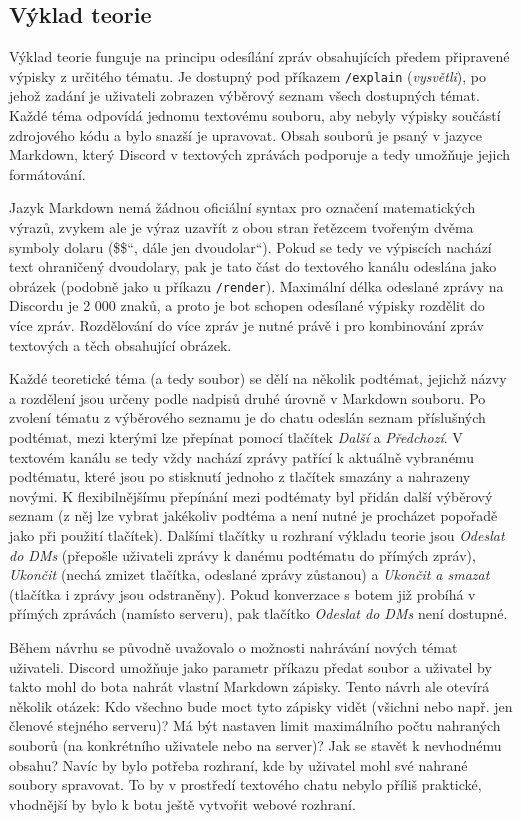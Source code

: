 \documentclass[FM]{tulthesis}
\begin{document}
	\subsection{Výklad teorie}
	
	Výklad teorie funguje na principu odesílání zpráv obsahujících předem připravené výpisky z určitého tématu. Je dostupný pod příkazem \verb*|/explain| (\textit{vysvětli}), po jehož zadání je uživateli zobrazen výběrový seznam všech dostupných témat. Každé téma odpovídá jednomu textovému souboru, aby nebyly výpisky součástí zdrojového kódu a bylo snazší je upravovat. Obsah souborů je psaný v jazyce Markdown, který Discord v textových zprávách podporuje a tedy umožňuje jejich formátování.
	
	Jazyk Markdown nemá žádnou oficiální syntax pro označení matematických výrazů, zvykem ale je výraz uzavřít z obou stran řetězcem tvořeným dvěma symboly dolaru (\quotedblbase\$\$\textquotedblleft, dále jen \quotedblbase dvoudolar\textquotedblleft). Pokud se tedy ve výpiscích nachází text ohraničený dvoudolary, pak je tato část do textového kanálu odeslána jako obrázek (podobně jako u příkazu \verb*|/render|). Maximální délka odeslané zprávy na Discordu je 2 000 znaků, a proto je bot schopen odesílané výpisky rozdělit do více zpráv. Rozdělování do více zpráv je nutné právě i pro kombinování zpráv textových a těch obsahující obrázek.
	
	Každé teoretické téma (a tedy soubor) se dělí na několik podtémat, jejichž názvy a rozdělení jsou určeny podle nadpisů druhé úrovně v Markdown souboru. Po zvolení tématu z výběrového seznamu je do chatu odeslán seznam příslušných podtémat, mezi kterými lze přepínat pomocí tlačítek \textit{Další} a \textit{Předchozí}. V textovém kanálu se tedy vždy nachází zprávy patřící k aktuálně vybranému podtématu, které jsou po stisknutí jednoho z tlačítek smazány a nahrazeny novými. K flexibilnějšímu přepínání mezi podtématy byl přidán další výběrový seznam (z něj lze vybrat jakékoliv podtéma a není nutné je procházet popořadě jako při použití tlačítek). Dalšími tlačítky u rozhraní výkladu teorie jsou \textit{Odeslat do DMs} (přepošle uživateli zprávy k danému podtématu do přímých zpráv), \textit{Ukončit} (nechá zmizet tlačítka, odeslané zprávy zůstanou) a \textit{Ukončit a smazat} (tlačítka i zprávy jsou odstraněny). Pokud konverzace s botem již probíhá v přímých zprávách (namísto serveru), pak tlačítko \textit{Odeslat do DMs} není dostupné.
	
	Během návrhu se původně uvažovalo o možnosti nahrávání nových témat uživateli. Discord umožňuje jako parametr příkazu předat soubor a uživatel by takto mohl do bota nahrát vlastní Markdown zápisky. Tento návrh ale otevírá několik otázek: Kdo všechno bude moct tyto zápisky vidět (všichni nebo např. jen členové stejného serveru)? Má být nastaven limit maximálního počtu nahraných souborů (na konkrétního uživatele nebo na server)? Jak se stavět k nevhodnému obsahu? Navíc by bylo potřeba rozhraní, kde by uživatel mohl své nahrané soubory spravovat. To by v prostředí textového chatu nebylo příliš praktické, vhodnější by bylo k botu ještě vytvořit webové rozhraní.
	
\end{document}
